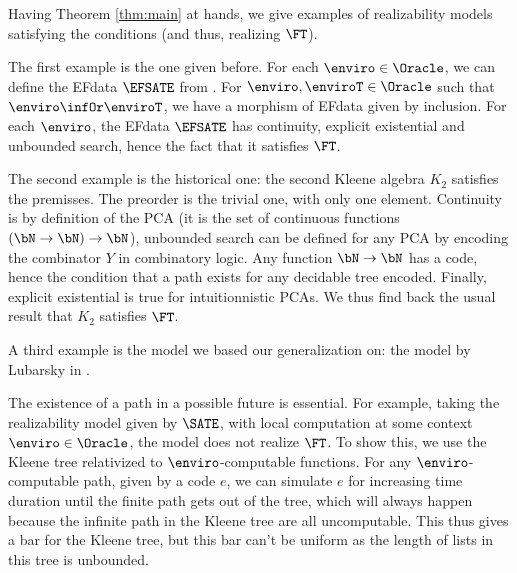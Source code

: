 Having Theorem \ref{thm:main} at hands, we give examples of realizability models satisfying the conditions (and thus, realizing $\FT$).

The first example is the one given before. For each $\enviro \in \Oracle$, we can define the EFdata $\EFSATE$ from . For $\enviro, \enviroT \in \Oracle$ such that $\enviro\infOr \enviroT$, we have a morphism of EFdata given by inclusion. For each $\enviro$, the EFdata $\EFSATE$ has continuity, explicit existential and unbounded search, hence the fact that it satisfies $\FT$.

The second example is the historical one: the second Kleene algebra $K_2$ \cite{Kleene1965} satisfies the premisses. The preorder is the trivial one, with only one element. Continuity is by definition of the PCA (it is the set of continuous functions $(\bN \to \bN) \to \bN$), unbounded search can be defined for any PCA by encoding the combinator $Y$ in combinatory logic. Any function $\bN \to \bN$ has a code, hence the condition that a path exists for any decidable tree encoded. Finally, explicit existential is true for intuitionnistic PCAs. We thus find back the usual result that $K_2$ satisfies $\FT$.

A third example is the model we based our generalization on: the model by Lubarsky in \cite{LubRat13}.

The existence of a path in a possible future is essential. For example, taking the realizability model given by $\SATE$, with local computation at some context $\enviro\in\Oracle$, the model does not realize $\FT$. To show this, we use the Kleene tree relativized to $\enviro$-computable functions. For any $\enviro$-computable path, given by a code $e$, we can simulate $e$ for increasing time duration until the finite path gets out of the tree, which will always happen because the infinite path in the Kleene tree are all uncomputable. This thus gives a bar for the Kleene tree, but this bar can't be uniform as the length of lists in this tree is unbounded.

